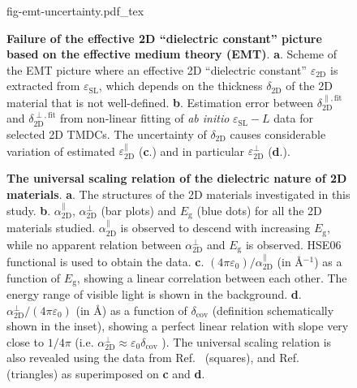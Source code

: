 \begin{figure}[!htbp]
  \centering
  {fig-emt-uncertainty.pdf_tex}
  \caption{\label{fig-emt} \textbf{Failure of the effective 2D
      ``dielectric constant'' picture based on the effective medium
      theory (EMT)}. \textbf{a}.  Scheme of the EMT picture where an
    effective 2D ``dielectric constant'' $\varepsilon_{\mathrm{2D}}$
    is extracted from $\varepsilon_{\mathrm{SL}}$, which depends on
    the thickness $\delta_{\mathrm{2D}}$ of the 2D material that is
    not well-defined. \textbf{b}.  Estimation error between
    $\delta_{\mathrm{2D}}^{\parallel, \text{fit}}$ and
    $\delta_{\mathrm{2D}}^{\perp, \text{fit}}$ from non-linear fitting
    of \textit{ab initio} $\varepsilon_{\mathrm{SL}} - L$ data for selected
    2D TMDCs. The uncertainty of
    $\delta_{\mathrm{2D}}$ causes considerable variation of estimated
    $\varepsilon_{\mathrm{2D}}^{\parallel}$ (\textbf{c}.) and in
    particular $\varepsilon_{\mathrm{2D}}^{\perp}$ (\textbf{d}.).  }
\end{figure}


\begin{figure}[H]
\centering
\caption{\label{fig-3} \textbf{The universal scaling relation of the
    dielectric nature of 2D materials}. \textbf{a}. The structures of
  the 2D materials investigated in this
  study. \textbf{b}. $\alpha_{\mathrm{2D}}^{\parallel}$,
  $\alpha_{\mathrm{2D}}^{\perp}$ (bar plots) and $E_{\mathrm{g}}$
  (blue dots) for all the 2D materials studied.
  $\alpha_{\mathrm{2D}}^{\parallel}$ is observed to descend with
  increasing $E_{\mathrm{g}}$, while no apparent relation between
  $\alpha_{\mathrm{2D}}^{\perp}$ and $E_{\mathrm{g}}$ is
  observed. HSE06 functional is used to obtain the data. \textbf{c}.
  $(4\pi \varepsilon_{0})/\alpha_{\mathrm{2D}}^{\parallel}$ (in
  \AA{}$^{-1}$) as a function of $E_{\mathrm{g}}$, showing a linear
  correlation between each other. The energy range of visible light is
  shown in the background. \textbf{d}.
  $\alpha_{\mathrm{2D}}^{\perp}/(4\pi\varepsilon_{0})$ (in \AA{}) as a
  function of $\delta_{\mathrm{cov}}$ (definition schematically shown
  in the inset), showing a perfect linear relation with slope very
  close to $1/4\pi$ (i.e.
  $\alpha_{\mathrm{2D}}^{\perp} \approx \varepsilon_{0}
  \delta_{\mathrm{cov}}$ ). The universal scaling relation is also
  revealed using the data from Ref.~\cite{Haastrup_2018} (squares),
  and Ref.~\cite{Mounet_2018} (triangles) as superimposed on
  \textbf{c} and \textbf{d}.}
\end{figure}




